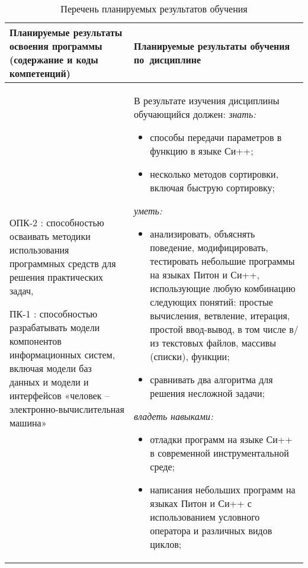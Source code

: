 \documentclass[a4paper,12pt]{article}
\begin{document}
\begin{longtable}{|p{54mm}|p{100mm}|}
  \caption{Перечень планируемых результатов обучения}\\
  \hline
  \centering
  Планируемые результаты освоения программы (содержание и коды компетенций) & 
  \centering\arraybackslash
  Планируемые результаты обучения по~дисциплине
  \\
  \hline
  \endhead
  
  ОПК-2 : способностью осваивать методики использования программных средств для решения практических задач, \par 
  
  ПК-1 : способностью разрабатывать модели компонентов информационных систем, включая модели баз данных и модели и интерфейсов «человек – электронно-вычислительная машина»
  & 
  В результате изучения дисциплины обучающийся должен:\newline
  \emph{знать:}
  \begin{itemize}[leftmargin=12pt]
    \item способы передачи параметров в функцию в языке Си++; 
    \item несколько методов сортировки, включая быструю сортировку; 
  \end{itemize}
  

  \emph{уметь:}
  \begin{itemize}[leftmargin=12pt]
    \item анализировать, объяснять поведение, модифицировать, тестировать небольшие программы на языках Питон и Си++, использующие любую комбинацию следующих понятий: простые вычисления, ветвление, итерация, простой ввод-вывод, в том числе в/из текстовых файлов, массивы (списки), функции; 
    \item сравнивать два алгоритма для решения несложной задачи; 
  \end{itemize}
  

  \emph{владеть навыками:}
  \begin{itemize}[leftmargin=12pt]
    \item отладки программ на языке Си++ в современной инструментальной среде; 
    \item написания небольших программ на языках Питон и Си++ с использованием условного оператора и различных видов циклов; 
  \end{itemize}
  
  \\
  \hline
  \end{longtable}
\end{document}
